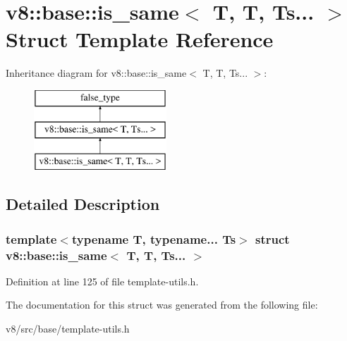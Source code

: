 \hypertarget{structv8_1_1base_1_1is__same_3_01T_00_01T_00_01Ts_8_8_8_01_4}{}\section{v8\+:\+:base\+:\+:is\+\_\+same$<$ T, T, Ts... $>$ Struct Template Reference}
\label{structv8_1_1base_1_1is__same_3_01T_00_01T_00_01Ts_8_8_8_01_4}
Inheritance diagram for v8\+:\+:base\+:\+:is\+\_\+same$<$ T, T, Ts... $>$\+:\begin{figure}[H]
\begin{center}
\leavevmode
\includegraphics[height=3.000000cm]{structv8_1_1base_1_1is__same_3_01T_00_01T_00_01Ts_8_8_8_01_4}
\end{center}
\end{figure}


\subsection{Detailed Description}
\subsubsection*{template$<$typename T, typename... Ts$>$\newline
struct v8\+::base\+::is\+\_\+same$<$ T, T, Ts... $>$}



Definition at line 125 of file template-\/utils.\+h.



The documentation for this struct was generated from the following file\+:\begin{DoxyCompactItemize}
\item 
v8/src/base/template-\/utils.\+h\end{DoxyCompactItemize}
